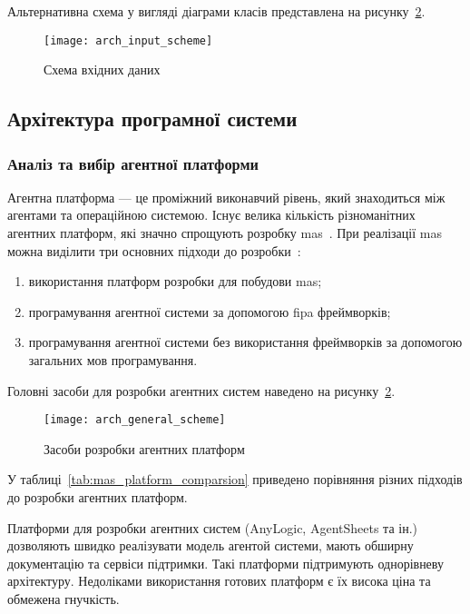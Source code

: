 Альтернативна схема у вигляді діаграми класів представлена на рисунку~\ref{fig:arch_general_scheme}.

\begin{figure}[H]
	\centering
	\texttt{[image: arch\_input\_scheme]}
	\caption{Схема вхідних даних}
	\label{fig:arch_input_scheme}
\end{figure}  

\subsection{Архітектура програмної системи}
\subsubsection{Аналіз та вибір агентної платформи}
Агентна платформа --- це проміжний виконавчий рівень, який знаходиться між агентами та операційною системою.
Існує велика кількість різноманітних агентних платформ, які значно спрощують розробку \acrshort{mas}~\cite{Kravari2015}.
При реалізації \acrshort{mas} можна виділити три основних підходи до розробки~\cite{Zhou2010}:
\begin{enumerate}[label={\arabic*)}]
	\item використання платформ розробки для побудови \acrshort{mas};
	\item програмування агентної системи за допомогою \acrshort{fipa} фреймворків;
	\item програмування агентної системи без використання фреймворків за допомогою загальних мов програмування.
\end{enumerate}

Головні засоби для розробки агентних систем наведено на рисунку~\ref{fig:arch_general_scheme}.

\begin{figure}[H]
	\centering
	\texttt{[image: arch\_general\_scheme]}
	\caption{Засоби розробки агентних платформ}
	\label{fig:arch_general_scheme}
\end{figure} 

У таблиці~\ref{tab:mas_platform_comparsion} приведено порівняння різних підходів до розробки агентних платформ.

Платформи для розробки агентних систем (AnyLogic, AgentSheets та ін.) дозволяють швидко реалізувати модель агентой системи, мають обширну документацію та сервіси підтримки. Такі платформи підтримують однорівневу архітектуру. Недоліками використання готових платформ є їх висока ціна та обмежена гнучкість.

